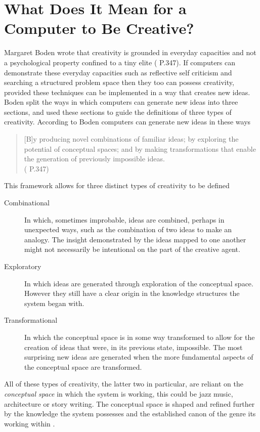 \documentclass[letterpaper]{article}
\begin{document}
\section{What Does It Mean for a Computer to Be Creative?}
Margaret Boden wrote that creativity is grounded in everyday capacities and not a psychological property confined to a tiny elite ( P.347). If computers can demonstrate these everyday capacities such as reflective self criticism and searching a structured problem space then they too can possess creativity, provided these techniques can be implemented in a way that creates new ideas. Boden split the ways in which computers can generate new ideas into three sections, and used these sections to guide the definitions of three types of creativity. According to Boden computers can generate new ideas in these ways
\begin{quote}
[B]y producing novel combinations of familiar ideas; by exploring the potential of conceptual spaces; and by making transformations that enable the generation of previously impossible ideas.\\
( P.347)
\end{quote}
This framework allows for three distinct types of creativity to be defined
\begin{description}
\item [Combinational] In which, sometimes improbable, ideas are combined, perhaps in unexpected ways, such as the combination of two ideas to make an analogy. The insight demonstrated by the ideas mapped to one another might not necessarily be intentional on the part of the creative agent.
\item [Exploratory] In which ideas are generated through exploration of the conceptual space. However they still have a clear origin in the knowledge structures the system began with.
\item [Transformational] In which the conceptual space is in some way transformed to allow for the creation of ideas that were, in its previous state, impossible. The most surprising new ideas are generated when the more fundamental aspects of the conceptual space are transformed.
\end{description}
All of these types of creativity, the latter two in particular, are reliant on the \emph{conceptual space} in which the system is working, this could be jazz music, architecture or story writing. The conceptual space is shaped and refined further by the knowledge the system possesses and the established canon of the genre its working within .\\ %
\end{document}
